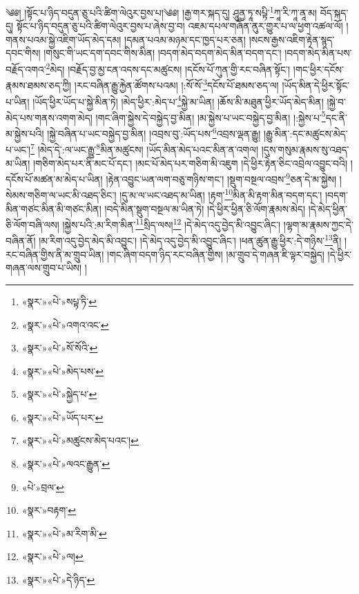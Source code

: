 ༄༅། །སྟོང་པ་ཉིད་བདུན་ཅུ་པའི་ཚིག་ལེའུར་བྱས་པ།༄༅། །རྒྱ་གར་སྐད་དུ། ཤཱུནྱ་ཏཱ་སཔྟི་\footnote{«སྣར་»«པེ་»སཔྟ་ཏི་}ཀཱ་རི་ཀཱ་ནཱ་མ། བོད་སྐད་དུ། སྟོང་པ་ཉིད་བདུན་ཅུ་པའི་ཚིག་ལེའུར་བྱས་པ་ཞེས་བྱ་བ། འཇམ་དཔལ་གཞོན་ནུར་གྱུར་པ་ལ་ཕྱག་འཚལ་ལོ། །གནས་པའམ་སྐྱེ་འཇིག་ཡོད་མེད་དམ། །དམན་པའམ་མཉམ་དང་ཁྱད་པར་ཅན། །སངས་རྒྱས་འཇིག་རྟེན་སྙད་དབང་གིས། །གསུང་གི་ཡང་དག་དབང་གིས་མིན། །བདག་མེད་བདག་མེད་མིན་བདག་དང་། །བདག་མེད་མིན་པས་བརྗོད་འགའ་\footnote{«སྣར་»«པེ་»འགའ་འང་}མེད། །བརྗོད་བྱ་མྱ་ངན་འདས་དང་མཚུངས། །དངོས་པོ་ཀུན་གྱི་རང་བཞིན་སྟོང་། །གང་ཕྱིར་དངོས་རྣམས་ཐམས་ཅད་ཀྱི། །རང་བཞིན་རྒྱུ་རྐྱེན་ཚོགས་པའམ། །:སོ་སོ་\footnote{«སྣར་»«པེ་»སོ་སོའི་}དངོས་པོ་ཐམས་ཅད་ལ། །ཡོད་མིན་དེ་ཕྱིར་སྟོང་པ་ཡིན། །ཡོད་ཕྱིར་ཡོད་པ་སྐྱེ་མིན་ཏེ། །མེད་ཕྱིར་:མེད་པ་\footnote{«སྣར་»«པེ་»མེད་པས་}སྐྱེ་མ་ཡིན། །ཆོས་མི་མཐུན་ཕྱིར་ཡོད་མེད་མིན། །སྐྱེ་བ་མེད་པས་གནས་འགག་མེད། །གང་ཞིག་སྐྱེས་དེ་བསྐྱེད་བྱ་མིན། །མ་སྐྱེས་པ་ཡང་བསྐྱེད་བྱ་མིན། །:སྐྱེས་པ་\footnote{«སྣར་»«པེ་»སྐྱེད་པ་}དང་ནི་མ་སྐྱེས་པའི། །སྐྱེ་བཞིན་པ་ཡང་བསྐྱེད་བྱ་མིན། །འབྲས་བུ་:ཡོད་པས་\footnote{«སྣར་»«པེ་»ཡོད་པར་}འབྲས་ལྡན་རྒྱུ། །རྒྱུ་མིན་:དང་མཚུངས་མེད་པ་ཡང་།\footnote{«སྣར་»«པེ་»མཚུངས་མེད་པའང་།} །མེད་དེ་:ལ་ཡང་རྒྱུ་\footnote{«སྣར་»«པེ་»ལའང་རྒྱུན་}མིན་མཚུངས། །ཡོད་མིན་མེད་པའང་མིན་ན་འགལ། །དུས་གསུམ་རྣམས་སུ་འཐད་མ་ཡིན། །གཅིག་མེད་པར་ནི་མང་པོ་དང་། །མང་པོ་མེད་པར་གཅིག་མི་འཇུག །དེ་ཕྱིར་རྟེན་ཅིང་འབྲེལ་འབྱུང་བའི། །དངོས་པོ་མཚན་མ་མེད་པ་ཡིན། །རྟེན་འབྱུང་ཡན་ལག་བཅུ་གཉིས་གང་། །སྡུག་བསྔལ་འབྲས་\footnote{«པེ་»བྲལ་}ཅན་དེ་མ་སྐྱེས། །སེམས་གཅིག་ལ་ཡང་མི་འཐད་ཅིང་། །དུ་མ་ལ་ཡང་འཐད་མ་ཡིན། །རྟག་\footnote{«སྣར་»བརྟག་}མིན་མི་རྟག་མིན་བདག་དང་། །བདག་མིན་གཙང་མིན་མི་གཙང་མིན། །བདེ་མིན་སྡུག་བསྔལ་མ་ཡིན་ཏེ། །དེ་ཕྱིར་ཕྱིན་ཅི་ལོག་རྣམས་མེད། །དེ་མེད་ཕྱིན་ཅི་ལོག་བཞི་ལས། །སྐྱེས་པའི་:མ་རིག་མིན་\footnote{«སྣར་»«པེ་»མ་རིག་མི་}སྲིད་ལས།\footnote{«སྣར་»«པེ་»ལ།} །དེ་མེད་འདུ་བྱེད་མི་འབྱུང་ཞིང་། །ལྷག་མ་རྣམས་ཀྱང་དེ་བཞིན་ནོ། །མ་རིག་འདུ་བྱེད་མེད་མི་འབྱུང་། །དེ་མེད་འདུ་བྱེད་མི་འབྱུང་ཞིང་། །ཕན་ཚུན་རྒྱུ་ཕྱིར་:དེ་གཉིས་\footnote{«སྣར་»«པེ་»དེ་ཉིད་}ནི། །རང་བཞིན་གྱིས་ནི་མ་གྲུབ་ཡིན། །གང་ཞིག་བདག་ཉིད་རང་བཞིན་གྱིས། །མ་གྲུབ་དེ་གཞན་ཇི་ལྟར་བསྐྱེད། །དེ་ཕྱིར་གཞན་ལས་གྲུབ་པ་ཡིས། །
